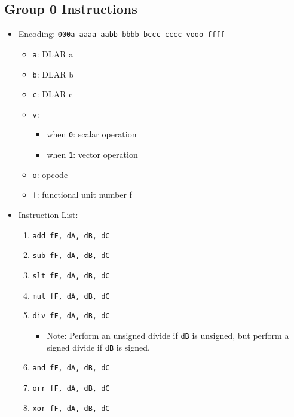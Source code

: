 \documentclass{article}
\begin{document}
	\subsection{Group 0 Instructions}
		\begin{itemize}
		\item Encoding:  \texttt{000a aaaa aabb bbbb  bccc cccc vooo ffff}
			\begin{itemize}
			\item \texttt{a}:  DLAR a
			\item \texttt{b}:  DLAR b
			\item \texttt{c}:  DLAR c
			\item \texttt{v}:
				\begin{itemize}
				\item when \texttt{0}:  scalar operation
				\item when \texttt{1}:  vector operation
				\end{itemize}
			\item \texttt{o}:  opcode
			\item \texttt{f}:  functional unit number f
			\end{itemize}
		\item Instruction List:
			\begin{enumerate}
			\item \texttt{add fF, dA, dB, dC}
			\item \texttt{sub fF, dA, dB, dC}
			\item \texttt{slt fF, dA, dB, dC}
			\item \texttt{mul fF, dA, dB, dC}

			\item \texttt{div fF, dA, dB, dC}
				\begin{itemize}
				\item Note:  Perform an unsigned divide if \texttt{dB} is
					unsigned, but perform a signed divide if \texttt{dB} is
					signed.
				\end{itemize}
			\item \texttt{and fF, dA, dB, dC}
			\item \texttt{orr fF, dA, dB, dC}
			\item \texttt{xor fF, dA, dB, dC}
			\end{enumerate}
		\end{itemize}
\end{document}
